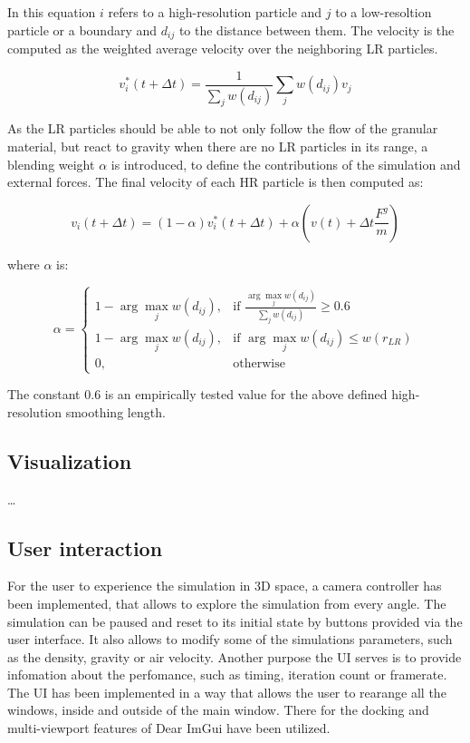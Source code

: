 \documentclass[intern]{cgMA}
\begin{document}
    In this equation $i$ refers to a high-resolution particle and $j$ to a low-resoltion particle or a boundary and $d_{ij}$ to the distance between them. The velocity is the computed as the weighted average velocity over the neighboring LR particles.\cite{10.2312:PE:vriphys:vriphys12:053-060}

    \begin{equation}
        v_i^*(t + \Delta t) = \frac{1}{\sum_j w(d_{ij})}\sum_j w(d_{ij})v_j
    \end{equation}

    As the LR particles should be able to not only follow the flow of the granular material, but react to gravity when there are no LR particles in its range, a blending weight $\alpha$ is introduced, to define the contributions of the simulation and external forces. The final velocity of each HR particle is then computed as:

    \begin{equation}
        v_i(t + \Delta t)  = (1 - \alpha)v_i^*(t + \Delta t) + \alpha(v(t) + \Delta t \frac{F^g}{m})
    \end{equation}

    where $\alpha$ is:

    \begin{equation}
        \alpha = 
        \begin{cases}
            1 - \arg \max_j w(d_{ij}),& \text{if } \frac{\arg \max_j w(d_{ij})}{\sum_j w(d_{ij})} \geq 0.6 \\
            1 - \arg \max_j w(d_{ij}),& \text{if } \arg \max_j w(d_{ij}) \leq w(r_{LR}) \\
            0,              & \text{otherwise}
        \end{cases}
    \end{equation}

    The constant $0.6$ is an empirically tested value for the above defined high-resolution smoothing length. \cite{10.2312:PE:vriphys:vriphys12:053-060} 
    
    \subsection{Visualization}
    \dots

    \subsection{User interaction}
    For the user to experience the simulation in 3D space, a camera controller has been implemented, that allows to explore the simulation from every angle. The simulation can be paused and reset to its initial state by buttons provided via the user interface. It also allows to modify some of the simulations parameters, such as the density, gravity or air velocity. Another purpose the UI serves is to provide infomation about the perfomance, such as timing, iteration count or framerate. The UI has been implemented in a way that allows the user to rearange all the windows, inside and outside of the main window. There for the docking and multi-viewport features of Dear ImGui have been utilized.
    
\end{document}
